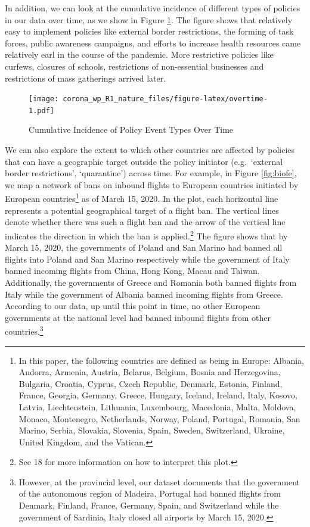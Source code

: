 \documentclass[
]{article}
\begin{document}
In addition, we can look at the cumulative incidence of different types of policies in our data over time, as we show in Figure \ref{fig:overtime}. The figure shows that relatively easy to implement policies like external border restrictions, the forming of task forces, public awareness campaigns, and efforts to increase health resources came relatively earl in the course of the pandemic. More restrictive policies like curfews, closures of schools, restrictions of non-essential businesses and restrictions of mass gatherings arrived later.

\begin{figure}
\centering
\texttt{[image: corona\_wp\_R1\_nature\_files/figure-latex/overtime-1.pdf]}
\caption{\label{fig:overtime}Cumulative Incidence of Policy Event Types Over Time}
\end{figure}

We can also explore the extent to which other countries are affected by policies that can have a geographic target outside the policy initiator (e.g.~`external border restrictions', `quarantine') across time. For example, in Figure \ref{fig:biofe}, we map a network of bans on inbound flights to European countries initiated by European countries\footnote{In this paper, the following countries are defined as being in Europe: Albania, Andorra, Armenia, Austria, Belarus, Belgium, Bosnia and Herzegovina, Bulgaria, Croatia, Cyprus, Czech Republic, Denmark, Estonia, Finland, France, Georgia, Germany, Greece, Hungary, Iceland, Ireland, Italy, Kosovo, Latvia, Liechtenstein, Lithuania, Luxembourg, Macedonia, Malta, Moldova, Monaco, Montenegro, Netherlands, Norway, Poland, Portugal, Romania, San Marino, Serbia, Slovakia, Slovenia, Spain, Sweden, Switzerland, Ukraine, United Kingdom, and the Vatican.} as of March 15, 2020. In the plot, each horizontal line represents a potential geographical target of a flight ban. The vertical lines denote whether there was such a flight ban and the arrow of the vertical line indicates the direction in which the ban is applied.\footnote{See 18 for more information on how to interpret this plot.} The figure shows that by March 15, 2020, the governments of Poland and San Marino had banned all flights into Poland and San Marino respectively while the government of Italy banned incoming flights from China, Hong Kong, Macau and Taiwan. Additionally, the governments of Greece and Romania both banned flights from Italy while the government of Albania banned incoming flights from Greece. According to our data, up until this point in time, no other European governments at the national level had banned inbound flights from other countries.\footnote{However, at the provincial level, our dataset documents that the government of the autonomous region of Madeira, Portugal had banned flights from Denmark, Finland, France, Germany, Spain, and Switzerland while the government of Sardinia, Italy closed all airports by March 15, 2020.}
\end{document}
